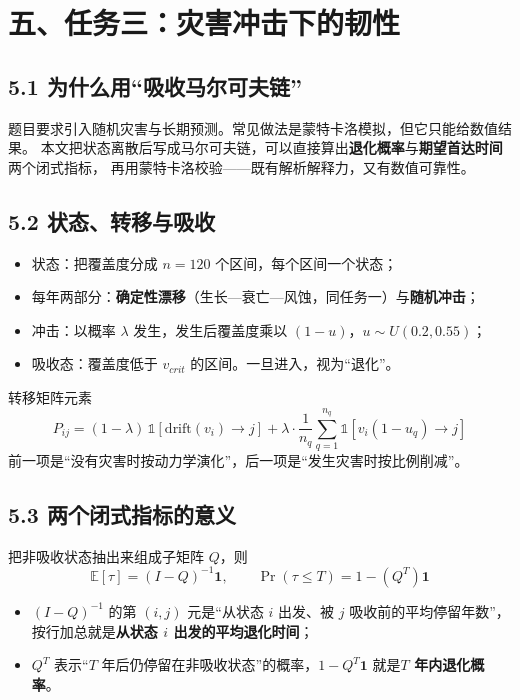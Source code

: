 \documentclass[11pt,a4paper]{ctexart}
\begin{document}
\section*{五、任务三：灾害冲击下的韧性}

\subsection*{5.1 为什么用“吸收马尔可夫链”}
题目要求引入随机灾害与长期预测。常见做法是蒙特卡洛模拟，但它只能给数值结果。
本文把状态离散后写成马尔可夫链，可以直接算出\textbf{退化概率}与\textbf{期望首达时间}两个闭式指标，
再用蒙特卡洛校验——既有解析解释力，又有数值可靠性。

\subsection*{5.2 状态、转移与吸收}
\begin{itemize}
\item 状态：把覆盖度分成 $n=120$ 个区间，每个区间一个状态；
\item 每年两部分：\textbf{确定性漂移}（生长—衰亡—风蚀，同任务一）与\textbf{随机冲击}；
\item 冲击：以概率 $\lambda$ 发生，发生后覆盖度乘以 $(1-u)$，$u\sim U(0.2,0.55)$；
\item 吸收态：覆盖度低于 $v_{crit}$ 的区间。一旦进入，视为“退化”。
\end{itemize}
转移矩阵元素
\begin{equation}
P_{ij}=(1-\lambda)\,\mathbb{1}\!\left[\text{drift}(v_i)\to j\right]
+\lambda\cdot\frac{1}{n_q}\sum_{q=1}^{n_q}\mathbb{1}\!\left[v_i(1-u_q)\to j\right]
\end{equation}
前一项是“没有灾害时按动力学演化”，后一项是“发生灾害时按比例削减”。

\subsection*{5.3 两个闭式指标的意义}
把非吸收状态抽出来组成子矩阵 $Q$，则
\begin{equation}
\mathbb{E}[\tau]=(I-Q)^{-1}\mathbf{1},\qquad
\Pr(\tau\le T)=1-\left(Q^{T}\right)\mathbf{1}
\end{equation}
\begin{itemize}
\item $(I-Q)^{-1}$ 的第 $(i,j)$ 元是“从状态 $i$ 出发、被 $j$ 吸收前的平均停留年数”，
按行加总就是\textbf{从状态 $i$ 出发的平均退化时间}；
\item $Q^T$ 表示“$T$ 年后仍停留在非吸收状态”的概率，$1-Q^T\mathbf{1}$ 就是\textbf{$T$ 年内退化概率}。
\end{itemize}
\end{document}
